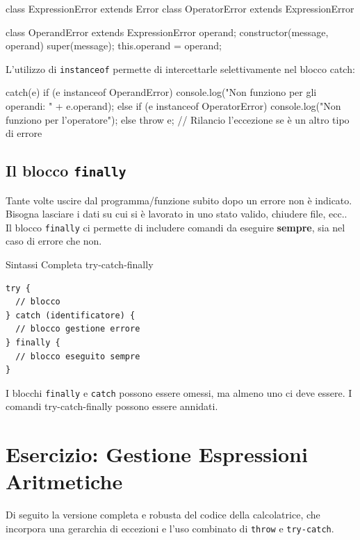 \begin{jsbox}[title={Gerarchia di Eccezioni Personalizzate}]
class ExpressionError extends Error {}
class OperatorError extends ExpressionError {}

class OperandError extends ExpressionError {
  operand;
  constructor(message, operand) {
    super(message);
    this.operand = operand;
  }
}
\end{jsbox}

L'utilizzo di \texttt{instanceof} permette di intercettarle selettivamente nel blocco catch:

\begin{jsbox}[title={Intercettazione mirata}]
catch(e) {
  if (e instanceof OperandError) {
    console.log("Non funziono per gli operandi: " + e.operand);
  } else if (e instanceof OperatorError) {
    console.log("Non funziono per l'operatore");
  } else {
    throw e; // Rilancio l'eccezione se è un altro tipo di errore
  }
}
\end{jsbox}

\subsection{Il blocco \texttt{finally}}
Tante volte uscire dal programma/funzione subito dopo un errore non è indicato. Bisogna lasciare i dati su cui si è lavorato in uno stato valido, chiudere file, ecc..
Il blocco \texttt{finally} ci permette di includere comandi da eseguire \textbf{sempre}, sia nel caso di errore che non.

\begin{definition}{Sintassi Completa try-catch-finally}
\begin{verbatim}
try {
  // blocco
} catch (identificatore) {
  // blocco gestione errore
} finally {
  // blocco eseguito sempre
}
\end{verbatim}
I blocchi \texttt{finally} e \texttt{catch} possono essere omessi, ma almeno uno ci deve essere. I comandi try-catch-finally possono essere annidati.
\end{definition}

\section{Esercizio: Gestione Espressioni Aritmetiche}
Di seguito la versione completa e robusta del codice della calcolatrice, che incorpora una gerarchia di eccezioni e l'uso combinato di \texttt{throw} e \texttt{try-catch}.


